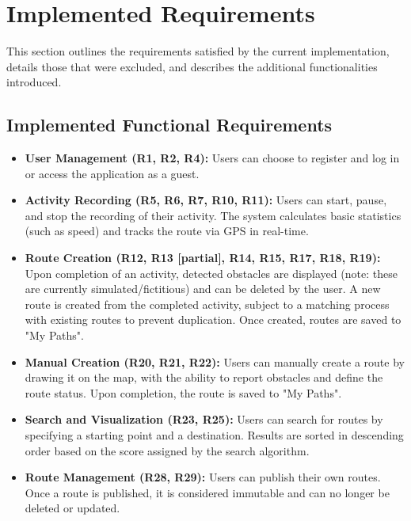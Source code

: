 \section{Implemented Requirements}
This section outlines the requirements satisfied by the current implementation, details those that were excluded, and describes the additional functionalities introduced.

\subsection{Implemented Functional Requirements}
\begin{itemize}
    \item \textbf{User Management (R1, R2, R4):} Users can choose to register and log in or access the application as a guest.
    \item \textbf{Activity Recording (R5, R6, R7, R10, R11):} Users can start, pause, and stop the recording of their activity. The system calculates basic statistics (such as speed) and tracks the route via GPS in real-time.
    \item \textbf{Route Creation (R12, R13 [partial], R14, R15, R17, R18, R19):} Upon completion of an activity, detected obstacles are displayed (note: these are currently simulated/fictitious) and can be deleted by the user. A new route is created from the completed activity, subject to a matching process with existing routes to prevent duplication. Once created, routes are saved to "My Paths".
    \item \textbf{Manual Creation (R20, R21, R22):} Users can manually create a route by drawing it on the map, with the ability to report obstacles and define the route status. Upon completion, the route is saved to "My Paths".
    \item \textbf{Search and Visualization (R23, R25):} Users can search for routes by specifying a starting point and a destination. Results are sorted in descending order based on the score assigned by the search algorithm.
    \item \textbf{Route Management (R28, R29):} Users can publish their own routes. Once a route is published, it is considered immutable and can no longer be deleted or updated.
\end{itemize}

